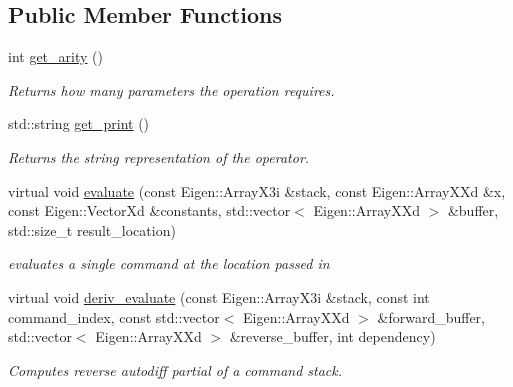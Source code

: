\subsection*{Public Member Functions}
\begin{DoxyCompactItemize}
\item 
int \hyperlink{classMultiplication_a696c850947f8fb31ad471dde80e8d2d2}{get\+\_\+arity} ()\hypertarget{classMultiplication_a696c850947f8fb31ad471dde80e8d2d2}{}\label{classMultiplication_a696c850947f8fb31ad471dde80e8d2d2}

\begin{DoxyCompactList}\small\item\em Returns how many parameters the operation requires. \end{DoxyCompactList}\item 
std\+::string \hyperlink{classMultiplication_aaa0b55c91c439c1d471fa5357b6b83a8}{get\+\_\+print} ()\hypertarget{classMultiplication_aaa0b55c91c439c1d471fa5357b6b83a8}{}\label{classMultiplication_aaa0b55c91c439c1d471fa5357b6b83a8}

\begin{DoxyCompactList}\small\item\em Returns the string representation of the operator. \end{DoxyCompactList}\item 
virtual void \hyperlink{classMultiplication_a19044777a8cc6ba3bc662d1fbadb7b28}{evaluate} (const Eigen\+::\+Array\+X3i \&stack, const Eigen\+::\+Array\+X\+Xd \&x, const Eigen\+::\+Vector\+Xd \&constants, std\+::vector$<$ Eigen\+::\+Array\+X\+Xd $>$ \&buffer, std\+::size\+\_\+t result\+\_\+location)
\begin{DoxyCompactList}\small\item\em evaluates a single command at the location passed in \end{DoxyCompactList}\item 
virtual void \hyperlink{classMultiplication_add5b53fbcd0f2e16c3be398c53d0fbe6}{deriv\+\_\+evaluate} (const Eigen\+::\+Array\+X3i \&stack, const int command\+\_\+index, const std\+::vector$<$ Eigen\+::\+Array\+X\+Xd $>$ \&forward\+\_\+buffer, std\+::vector$<$ Eigen\+::\+Array\+X\+Xd $>$ \&reverse\+\_\+buffer, int dependency)
\begin{DoxyCompactList}\small\item\em Computes reverse autodiff partial of a command stack. \end{DoxyCompactList}\end{DoxyCompactItemize}


